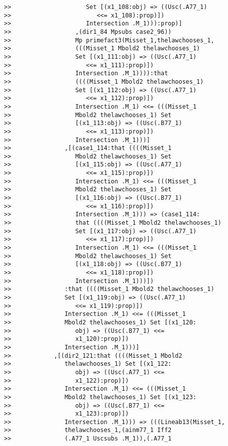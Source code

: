 \documentclass[12pt]{article}
\begin{document}
\begin{verbatim}
>>                     Set [(x1_108:obj) => ((Usc(.A77_1)
>>                        <<= x1_108):prop)])
>>                     Intersection .M_1))):prop)]
>>                  ,(dir1_84 Mpsubs case2_96))
>>                  Mp primefact3(Misset_1,thelawchooses_1,
>>                  (((Misset_1 Mbold2 thelawchooses_1)
>>                  Set [(x1_111:obj) => ((Usc(.A77_1)
>>                     <<= x1_111):prop)])
>>                  Intersection .M_1)))):that
>>                  ((((Misset_1 Mbold2 thelawchooses_1)
>>                  Set [(x1_112:obj) => ((Usc(.A77_1)
>>                     <<= x1_112):prop)])
>>                  Intersection .M_1) <<= (((Misset_1
>>                  Mbold2 thelawchooses_1) Set
>>                  [(x1_113:obj) => ((Usc(.B77_1)
>>                     <<= x1_113):prop)])
>>                  Intersection .M_1)))]
>>               ,[(case1_114:that ((((Misset_1
>>                  Mbold2 thelawchooses_1) Set
>>                  [(x1_115:obj) => ((Usc(.A77_1)
>>                     <<= x1_115):prop)])
>>                  Intersection .M_1) <<= (((Misset_1
>>                  Mbold2 thelawchooses_1) Set
>>                  [(x1_116:obj) => ((Usc(.B77_1)
>>                     <<= x1_116):prop)])
>>                  Intersection .M_1))) => (case1_114:
>>                  that ((((Misset_1 Mbold2 thelawchooses_1)
>>                  Set [(x1_117:obj) => ((Usc(.A77_1)
>>                     <<= x1_117):prop)])
>>                  Intersection .M_1) <<= (((Misset_1
>>                  Mbold2 thelawchooses_1) Set
>>                  [(x1_118:obj) => ((Usc(.B77_1)
>>                     <<= x1_118):prop)])
>>                  Intersection .M_1)))])
>>               :that ((((Misset_1 Mbold2 thelawchooses_1)
>>               Set [(x1_119:obj) => ((Usc(.A77_1)
>>                  <<= x1_119):prop)])
>>               Intersection .M_1) <<= (((Misset_1
>>               Mbold2 thelawchooses_1) Set [(x1_120:
>>                  obj) => ((Usc(.B77_1) <<=
>>                  x1_120):prop)])
>>               Intersection .M_1)))]
>>            ,[(dir2_121:that ((((Misset_1 Mbold2
>>               thelawchooses_1) Set [(x1_122:
>>                  obj) => ((Usc(.A77_1) <<=
>>                  x1_122):prop)])
>>               Intersection .M_1) <<= (((Misset_1
>>               Mbold2 thelawchooses_1) Set [(x1_123:
>>                  obj) => ((Usc(.B77_1) <<=
>>                  x1_123):prop)])
>>               Intersection .M_1))) => (((Lineab13(Misset_1,
>>               thelawchooses_1,(ainm77_1 Iff2
>>               (.A77_1 Uscsubs .M_1)),(.A77_1

\end{verbatim}
\end{document}
